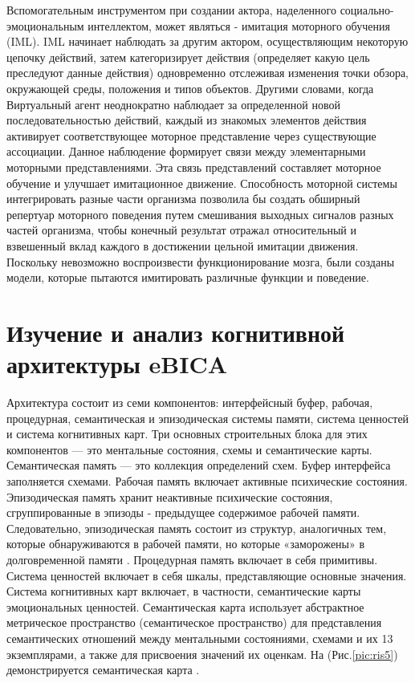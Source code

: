 Вспомогательным инструментом при создании актора, наделенного социально- эмоциональным интеллектом, 
может являться - имитация моторного обучения (IML). IML начинает наблюдать за другим актором, осуществляющим 
некоторую цепочку действий, затем категоризирует действия (определяет какую цель преследуют данные действия) 
одновременно отслеживая изменения точки обзора, окружающей среды, положения и типов объектов. Другими словами, 
когда Виртуальный агент неоднократно наблюдает за определенной новой последовательностью действий, каждый из 
знакомых элементов действия активирует соответствующее моторное представление через существующие ассоциации. 
Данное наблюдение формирует связи между элементарными моторными представлениями. Эта связь представлений 
составляет моторное обучение и улучшает имитационное движение. Способность моторной системы интегрировать 
разные части организма позволила бы создать обширный репертуар моторного поведения путем смешивания выходных 
сигналов разных частей организма, чтобы конечный результат отражал относительный и взвешенный вклад каждого в 
достижении цельной имитации движения. Поскольку невозможно воспроизвести функционирование мозга, были созданы 
модели, которые пытаются имитировать различные функции и поведение.

\section{Изучение и анализ когнитивной архитектуры eBICA}

Архитектура состоит из семи компонентов: интерфейсный буфер, рабочая, процедурная, семантическая 
и эпизодическая системы памяти, система ценностей и система когнитивных карт. Три основных строительных 
блока для этих компонентов — это ментальные состояния, схемы и семантические карты. 
Семантическая память — это коллекция определений схем. Буфер интерфейса заполняется схемами. 
Рабочая память включает активные психические состояния. Эпизодическая память хранит неактивные психические состояния,
сгруппированные в эпизоды - предыдущее содержимое рабочей памяти. Следовательно, эпизодическая память состоит из структур, 
аналогичных тем, которые обнаруживаются в рабочей памяти, но которые «заморожены» в долговременной памяти \cite{seman_karta}. Процедурная 
память включает в себя примитивы. Система ценностей включает в себя шкалы, представляющие основные значения. 
Система когнитивных карт включает, в частности, семантические карты эмоциональных ценностей. 
Семантическая карта использует абстрактное метрическое пространство (семантическое пространство) для представления
семантических отношений между ментальными состояниями, схемами и их 13 экземплярами, а также для присвоения значений их оценкам. 
На (Рис.\ref{pic:ris5}) демонстрируется семантическая карта \cite{seman_karta}.

